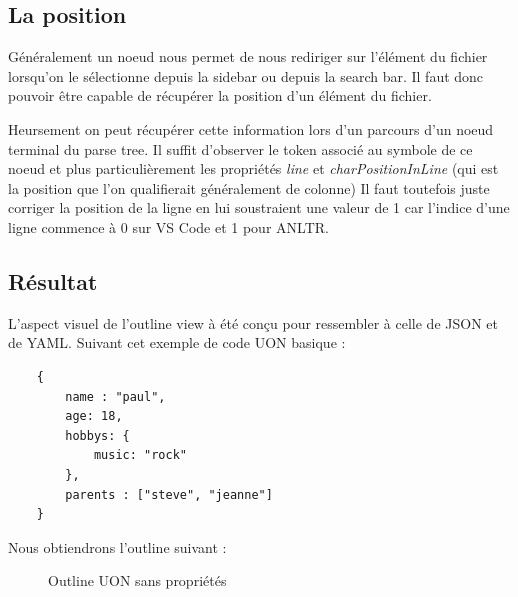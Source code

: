 \documentclass[
    iict, %
    il, %
]{heig-tb}
\begin{document}
\subsection{La position}

Généralement un noeud nous permet de nous rediriger sur l'élément du fichier lorsqu'on le sélectionne depuis la sidebar ou depuis la search bar. %
Il faut donc pouvoir être capable de récupérer la position d'un élément du fichier.

Heursement on peut récupérer cette information lors d'un parcours d'un noeud terminal du parse tree.
Il suffit d'observer le token associé au symbole de ce noeud et plus particulièrement les
propriétés \emph{line} et \emph{charPositionInLine} (qui est la position que l'on qualifierait généralement de colonne)
Il faut toutefois juste corriger la position de la ligne en lui soustraient une valeur de 1 car l'indice d'une ligne commence à 0 sur VS Code et 1 pour ANLTR.

\subsection{Résultat}
L'aspect visuel de l'outline view à été conçu pour ressembler à celle de JSON et de YAML.
Suivant cet exemple de code UON basique :

\begin{lstlisting}
    {
        name : "paul",
        age: 18,
        hobbys: {
            music: "rock"
        },
        parents : ["steve", "jeanne"]
    }
\end{lstlisting}

Nous obtiendrons l'outline suivant :

\begin{figure}[!h]
    \begin{center}
    \end{center}
    \caption[Outline UON sans propriétés]{\label{uon-payload-outline-without-properties} Outline UON sans propriétés}
\end{figure}
\end{document}

